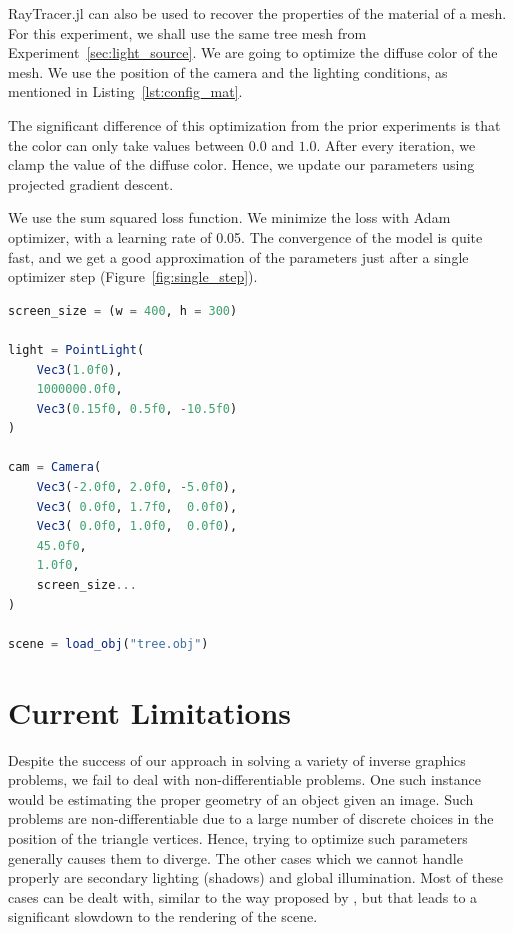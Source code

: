 \documentclass{juliacon}
\begin{document}
RayTracer.jl can also be used to recover the properties of the material of a mesh. For this experiment, we shall use the same tree mesh from Experiment~\ref{sec:light_source}. We are going to optimize the diffuse color of the mesh. We use the position of the camera and the lighting conditions, as mentioned in Listing~\ref{lst:config_mat}.

The significant difference of this optimization from the prior experiments is that the color can only take values between $0.0$ and $1.0$. After every iteration, we clamp the value of the diffuse color. Hence, we update our parameters using projected gradient descent.

We use the sum squared loss function. We minimize the loss with Adam optimizer, with a learning rate of 0.05. The convergence of the model is quite fast, and we get a good approximation of the parameters just after a single optimizer step (Figure~\ref{fig:single_step}).

\begin{lstlisting}[caption = {Configuration of the Scene for Experiment~\ref{sec:mat_color}},
                   label = {lst:config_mat},
                   captionpos = b,
                   language = Julia]
screen_size = (w = 400, h = 300)

light = PointLight(
    Vec3(1.0f0),
    1000000.0f0,
    Vec3(0.15f0, 0.5f0, -10.5f0)
)

cam = Camera(
    Vec3(-2.0f0, 2.0f0, -5.0f0),
    Vec3( 0.0f0, 1.7f0,  0.0f0),
    Vec3( 0.0f0, 1.0f0,  0.0f0),
    45.0f0,
    1.0f0,
    screen_size...
)

scene = load_obj("tree.obj")
\end{lstlisting}


\section{Current Limitations}
\label{sec:limitation}

Despite the success of our approach in solving a variety of inverse graphics problems, we fail to deal with non-differentiable problems. One such instance would be estimating the proper geometry of an object given an image. Such problems are non-differentiable due to a large number of discrete choices in the position of the triangle vertices. Hence, trying to optimize such parameters generally causes them to diverge. The other cases which we cannot handle properly are secondary lighting (shadows) and global illumination. Most of these cases can be dealt with, similar to the way proposed by \cite{Li:2018:DMC}, but that leads to a significant slowdown to the rendering of the scene. 
\end{document}
